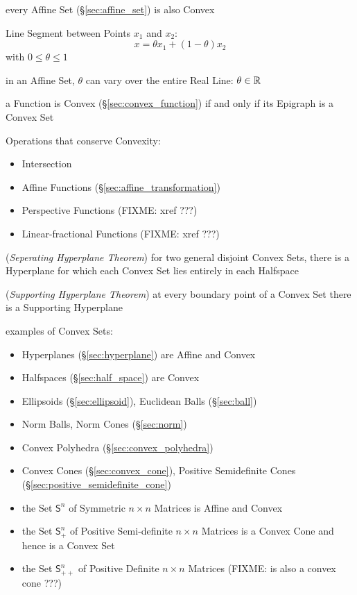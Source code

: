every Affine Set (\S\ref{sec:affine_set}) is also Convex

Line Segment between Points $x_1$ and $x_2$:
\[
  x = \theta x_1 + (1-\theta) x_2
\]
with $0 \leq \theta \leq 1$

\fist in an Affine Set, $\theta$ can vary over the entire Real Line: $\theta
\in \mathbb{R}$

a Function is Convex (\S\ref{sec:convex_function}) if and only if its Epigraph
is a Convex Set

Operations that conserve Convexity:
\begin{itemize}
  \item Intersection
  \item Affine Functions (\S\ref{sec:affine_transformation})
  \item Perspective Functions (FIXME: xref ???)
  \item Linear-fractional Functions (FIXME: xref ???)
\end{itemize}

(\emph{Seperating Hyperplane Theorem}) for two general disjoint Convex Sets,
there is a Hyperplane for which each Convex Set lies entirely in each Halfspace

(\emph{Supporting Hyperplane Theorem}) at every boundary point of a Convex Set
there is a Supporting Hyperplane

examples of Convex Sets:
\begin{itemize}
  \item Hyperplanes (\S\ref{sec:hyperplane}) are Affine and Convex
  \item Halfspaces (\S\ref{sec:half_space}) are Convex
  \item Ellipsoids (\S\ref{sec:ellipsoid}), Euclidean Balls (\S\ref{sec:ball})
  \item Norm Balls, Norm Cones (\S\ref{sec:norm})
  \item Convex Polyhedra (\S\ref{sec:convex_polyhedra})
  \item Convex Cones (\S\ref{sec:convex_cone}), Positive Semidefinite Cones
    (\S\ref{sec:positive_semidefinite_cone})
  \item the Set $\mathsf{S}^n$ of Symmetric $n \times n$ Matrices is Affine and
    Convex
  \item the Set $\mathsf{S}_+^n$ of Positive Semi-definite $n \times n$
    Matrices is a Convex Cone and hence is a Convex Set
  \item the Set $\mathsf{S}_{++}^n$ of Positive Definite $n \times n$ Matrices
    (FIXME: is also a convex cone ???)
\end{itemize}



